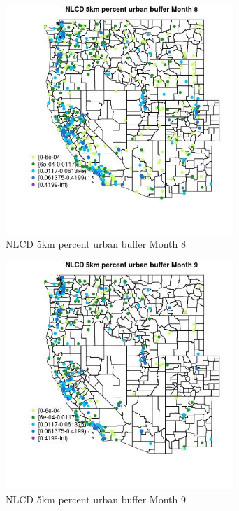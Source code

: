 \begin{figure} 
\centering  
\includegraphics[width=0.77\textwidth]{Code_Outputs/Report_ML_input_PM25_Step4_part_e_de_duplicated_aves_compiled_2019-05-18wNAs_MapObsMo8NLCD_5km_percent_urban_buffer.jpg} 
\caption{\label{fig:Report_ML_input_PM25_Step4_part_e_de_duplicated_aves_compiled_2019-05-18wNAsMapObsMo8NLCD_5km_percent_urban_buffer}NLCD 5km percent urban buffer Month 8} 
\end{figure} 
 

\begin{figure} 
\centering  
\includegraphics[width=0.77\textwidth]{Code_Outputs/Report_ML_input_PM25_Step4_part_e_de_duplicated_aves_compiled_2019-05-18wNAs_MapObsMo9NLCD_5km_percent_urban_buffer.jpg} 
\caption{\label{fig:Report_ML_input_PM25_Step4_part_e_de_duplicated_aves_compiled_2019-05-18wNAsMapObsMo9NLCD_5km_percent_urban_buffer}NLCD 5km percent urban buffer Month 9} 
\end{figure} 
 

